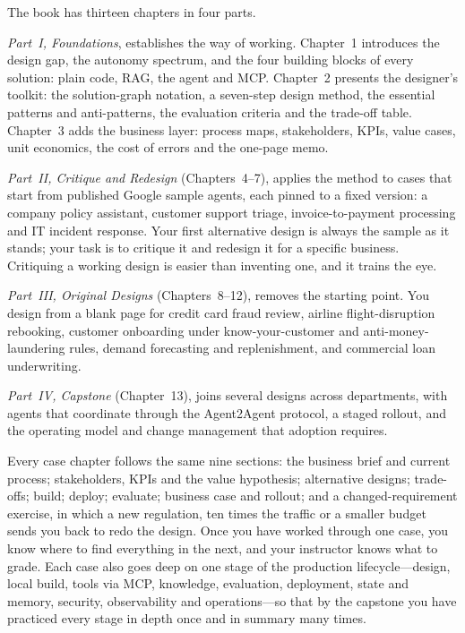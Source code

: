 The book has thirteen chapters in four parts.

\emph{Part~I, Foundations}, establishes the way of working. Chapter~1 introduces the design gap, the autonomy spectrum, and the four building blocks of every solution: plain code, RAG, the agent and MCP. Chapter~2 presents the designer's toolkit: the solution-graph notation, a seven-step design method, the essential patterns and anti-patterns, the evaluation criteria and the trade-off table. Chapter~3 adds the business layer: process maps, stakeholders, KPIs, value cases, unit economics, the cost of errors and the one-page memo.

\emph{Part~II, Critique and Redesign} (Chapters~4--7), applies the method to cases that start from published Google sample agents, each pinned to a fixed version: a company policy assistant, customer support triage, invoice-to-payment processing and IT incident response. Your first alternative design is always the sample as it stands; your task is to critique it and redesign it for a specific business. Critiquing a working design is easier than inventing one, and it trains the eye.

\emph{Part~III, Original Designs} (Chapters~8--12), removes the starting point. You design from a blank page for credit card fraud review, airline flight-disruption rebooking, customer onboarding under know-your-customer and anti-money-laundering rules, demand forecasting and replenishment, and commercial loan underwriting.

\emph{Part~IV, Capstone} (Chapter~13), joins several designs across departments, with agents that coordinate through the Agent2Agent protocol, a staged rollout, and the operating model and change management that adoption requires.

Every case chapter follows the same nine sections: the business brief and current process; stakeholders, KPIs and the value hypothesis; alternative designs; trade-offs; build; deploy; evaluate; business case and rollout; and a changed-requirement exercise, in which a new regulation, ten times the traffic or a smaller budget sends you back to redo the design. Once you have worked through one case, you know where to find everything in the next, and your instructor knows what to grade. Each case also goes deep on one stage of the production lifecycle---design, local build, tools via MCP, knowledge, evaluation, deployment, state and memory, security, observability and operations---so that by the capstone you have practiced every stage in depth once and in summary many times.


